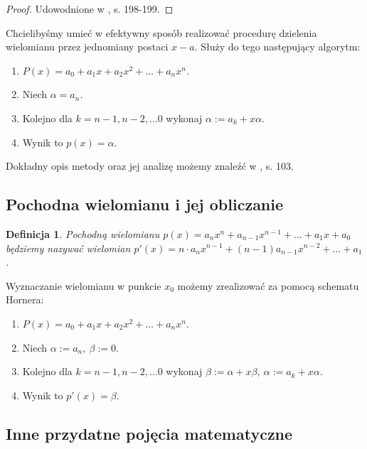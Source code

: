 \documentclass{article}
\newtheorem{definicja}{Definicja}
\begin{document}
\begin{proof}
Udowodnione w \cite{kostrikin}, s. 198-199.
\end{proof}

Chcielibyśmy umieć w efektywny sposób realizować procedurę dzielenia wielomianu przez jednomiany postaci $x-a$. Służy do tego następujący algorytm:

\begin{enumerate}
\item $P(x) = a_0 + a_1 x + a_2 x^2 + \ldots + a_n x^n$.
\item Niech $\alpha = a_n$.
\item Kolejno dla $k = n-1, n-2, \ldots 0$ wykonaj $\alpha := a_k + x \alpha$.
\item Wynik to $p(x) = \alpha$.
\end{enumerate}

Dokładny opis metody oraz jej analizę możemy znaleźć w \cite{kincaid}, s. 103.\\

\subsection{Pochodna wielomianu i jej obliczanie}

\begin{definicja}
Pochodną wielomianu $p(x) = a_nx^n + a_{n-1}x^{n-1} + \ldots + a_1x + a_0$ będziemy nazywać wielomian $p'(x) = 	n \cdot a_n x^{n-1} + (n-1) a_{n-1}x^{n-2} + \ldots +  a_1$.
\end{definicja}

Wyznaczanie wielomianu w punkcie $x_0$ możemy zrealizować za pomocą schematu Hornera:

\begin{enumerate}
\item $P(x) = a_0 + a_1 x + a_2 x^2 + \ldots + a_n x^n$.
\item Niech $\alpha := a_n, \ \beta := 0$.
\item Kolejno dla $k = n-1, n-2, \ldots 0$ wykonaj $\beta := \alpha + x \beta, \ \alpha := a_k + x \alpha.$

\item Wynik to $p'(x) = \beta$.
\end{enumerate}

\subsection{Inne przydatne pojęcia matematyczne}
\end{document}
